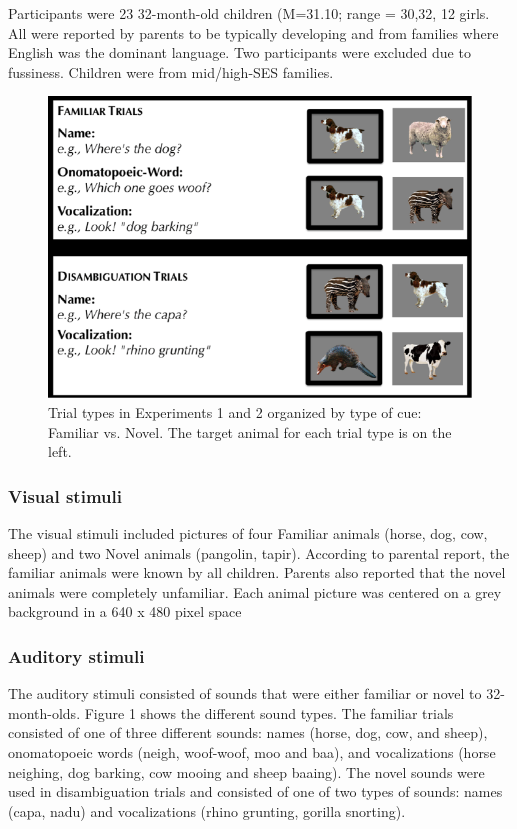 \documentclass[english,floatsintext,man]{apa6}
\theoremstyle{definition}
\theoremstyle{definition}
\theoremstyle{definition}
\theoremstyle{remark}
\begin{document}
Participants were 23 32-month-old children (M=31.10; range = 30,32, 12
girls. All were reported by parents to be typically developing and from
families where English was the dominant language. Two participants were
excluded due to fussiness. Children were from mid/high-SES families.

\begin{figure}[tb]

{\centering \includegraphics[width=0.7\linewidth]{anime_manuscript_files/figure-latex/stimuli-e1-1} 

}

\caption{Trial types in Experiments 1 and 2 organized by type of cue: Familiar vs. Novel. The target animal for each trial type is on the left.}\label{fig:stimuli-e1}
\end{figure}

\hypertarget{visual-stimuli}{%
\subsubsection{Visual stimuli}\label{visual-stimuli}}

The visual stimuli included pictures of four Familiar animals (horse,
dog, cow, sheep) and two Novel animals (pangolin, tapir). According to
parental report, the familiar animals were known by all children.
Parents also reported that the novel animals were completely unfamiliar.
Each animal picture was centered on a grey background in a 640 x 480
pixel space

\hypertarget{auditory-stimuli}{%
\subsubsection{Auditory stimuli}\label{auditory-stimuli}}

The auditory stimuli consisted of sounds that were either familiar or
novel to 32-month-olds. Figure 1 shows the different sound types. The
familiar trials consisted of one of three different sounds: names
(horse, dog, cow, and sheep), onomatopoeic words (neigh, woof-woof, moo
and baa), and vocalizations (horse neighing, dog barking, cow mooing and
sheep baaing). The novel sounds were used in disambiguation trials and
consisted of one of two types of sounds: names (capa, nadu) and
vocalizations (rhino grunting, gorilla snorting).
\end{document}
